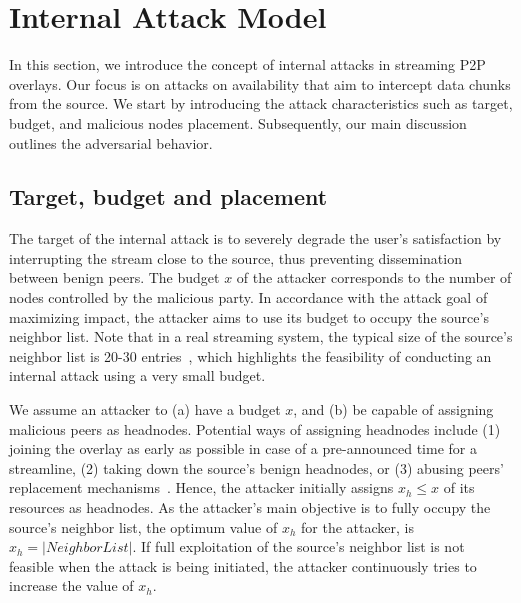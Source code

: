 \section{Internal Attack Model}
\label{sec:Attack}

In this section, we introduce the concept of internal attacks in streaming P2P overlays.
Our focus is on attacks on availability that aim to intercept data chunks from the source. 
We start by introducing the attack characteristics such as target, budget, and malicious nodes placement. 
Subsequently, our main discussion outlines the \drop adversarial behavior. 

\subsection{Target, budget and placement}


The target of the internal attack is to severely degrade the user's satisfaction by interrupting the stream close to the source, thus preventing dissemination between benign peers.
The budget $x$ of the attacker corresponds to the number of nodes controlled by the malicious party. 
In accordance with the attack goal of maximizing impact, the attacker aims to use its budget to occupy the source's neighbor list. 
Note that in a real streaming system, the typical size of the source's neighbor list is 20-30 entries~\cite{neighborlist1,neighborlist2}, which highlights the feasibility of conducting an internal attack using a very small budget.


We assume an attacker to (a) have a budget $x$, and (b) be capable of assigning malicious peers as headnodes.
Potential ways of assigning headnodes include (1) joining the overlay as early as possible in case of a pre-announced time for a streamline, (2) taking down the source's benign headnodes, or (3) abusing peers' replacement mechanisms~\cite{nguyen2016swap}.
Hence, the attacker initially assigns $x_h \leq x$ of its resources as headnodes.
As the attacker's main objective is to fully occupy the source's neighbor list, the optimum value of $x_h$ for the attacker, is $x_h = |NeighborList|$.
If full exploitation of the source's neighbor list is not feasible when the attack is being initiated, the attacker continuously tries to increase the value of $x_h$.  

